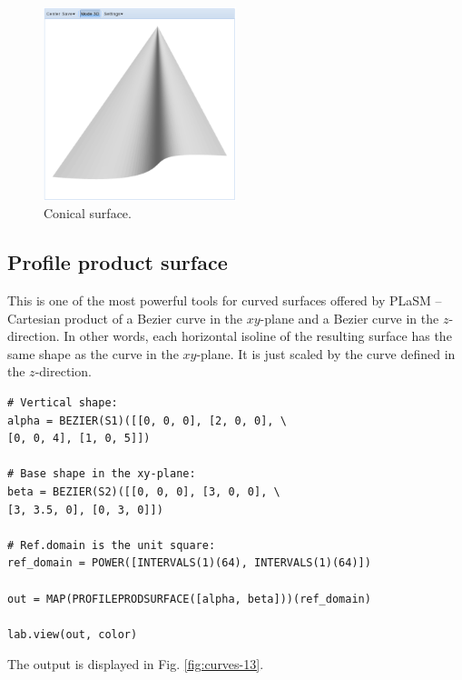 \documentclass{article}
\begin{document}
\begin{figure}[!ht]
\begin{center}
\includegraphics[width=0.5\textwidth]{img/curves-12.png}
\end{center}
\vspace{-2mm}
\caption{Conical surface.}
\label{fig:curves-12}
\end{figure}



\subsection{Profile product surface}

This is one of the most powerful tools for curved surfaces offered by PLaSM --
Cartesian product of a Bezier curve in the $xy$-plane and a Bezier curve 
in the $z$-direction. In other words, each horizontal isoline of the resulting 
surface has the same shape as the curve in the $xy$-plane. It is just scaled by 
the curve defined in the $z$-direction.

\begin{verbatim}
# Vertical shape:
alpha = BEZIER(S1)([[0, 0, 0], [2, 0, 0], \
[0, 0, 4], [1, 0, 5]])

# Base shape in the xy-plane:
beta = BEZIER(S2)([[0, 0, 0], [3, 0, 0], \
[3, 3.5, 0], [0, 3, 0]])

# Ref.domain is the unit square:
ref_domain = POWER([INTERVALS(1)(64), INTERVALS(1)(64)])

out = MAP(PROFILEPRODSURFACE([alpha, beta]))(ref_domain)
 
lab.view(out, color)
\end{verbatim}
The output is displayed in Fig. \ref{fig:curves-13}.
\end{document}
